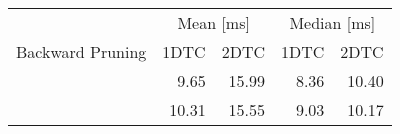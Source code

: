 \begin{tabular}{crrrr}
	\toprule
	                 & \multicolumn{2}{c}{Mean [\si{\milli\second}]} & \multicolumn{2}{c}{Median [\si{\milli\second}]}               \\
	Backward Pruning & 1DTC                                          & 2DTC                                            & 1DTC & 2DTC \\
	\midrule
	\xmark           & 9.65                                             & 15.99                                               & 8.36    & 10.40    \\
	\cmark           & 10.31                                             & 15.55                                               & 9.03    & 10.17    \\
	\bottomrule
\end{tabular}
